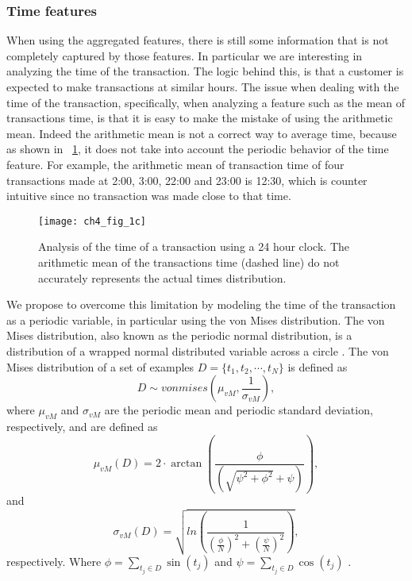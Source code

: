 	\subsubsection{Time features}
	\label{sec:4:frad:features_time}
	
  When using the aggregated features, there is still some information that is not completely 
  captured by those features. In particular we are interesting in analyzing the time of the 
  transaction. The logic behind this, is that a customer is expected to make transactions at 
  similar hours. The issue when dealing with the time of the transaction, 
  specifically, when analyzing a feature such as the mean of transactions time, is that it is easy 
  to make the mistake of using the arithmetic mean. Indeed the arithmetic mean is not a correct 
  way to average time, because as shown in \figurename{~\ref{fig:4:von1}}, it does not take into 
  account the periodic behavior of the time feature. For example, the arithmetic mean of 
  transaction time of four transactions made at 2:00, 3:00, 22:00 and 23:00 is 12:30, which is 
  counter intuitive since no transaction was made close to that time.

  \begin{figure}[!t]
  \centering
  \texttt{[image: ch4\_fig\_1c]}
  \caption{Analysis of the time of a transaction using a 24 hour clock. The arithmetic mean of the 
  transactions time (dashed line) do not accurately represents the actual times distribution.}
  \label{fig:4:von1}
  \end{figure} 
  
  We propose to overcome this limitation by modeling the time of the transaction as a periodic 
  variable, in particular using the von Mises distribution. The von Mises distribution, also known 
  as the periodic normal distribution, is a distribution of a wrapped normal distributed 
  variable across a circle \citep{Fisher1996}. The von Mises distribution of a set of examples 
  $D=\{t_1,t_2,\cdots,t_N\}$ is defined as
  \begin{equation}
  D \sim vonmises\left( \mu_{vM} , \frac{1}{\sigma_{vM}} \right),
  \end{equation}
  where $\mu_{vM}$ and $\sigma_{vM}$ are the periodic mean and periodic standard deviation, 
  respectively, and are defined as
  \begin{equation}
    \mu_{vM}(D) =  2\cdot \arctan\left(\frac{\phi}{\left(
    \sqrt{\psi^2 + \phi^2} +  \psi \right)} \right),
  \end{equation}
  and
  \begin{equation}
    \sigma_{vM}(D) = \sqrt{ ln\left( \frac{1}{
    \left(\frac{\phi}{N} \right)^2  + \left(\frac{\psi}{N} \right)^2 } \right) },
  \end{equation}
  respectively. Where $\phi=\sum_{t_j \in D} \sin(t_j)$ and $\psi=\sum_{t_j \in D }\cos(t_j)$ 
  \citep{Bishop2006}. 
  
